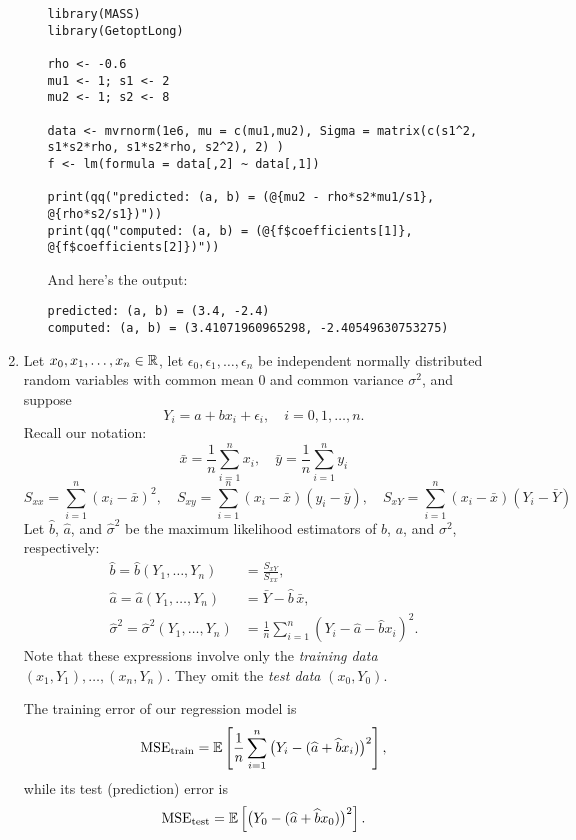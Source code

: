 \documentclass[12pt]{amsart}
\begin{document}
\begin{enumerate}
\begin{enumerate}
        \bigskip
        \begin{verbatim}
library(MASS)
library(GetoptLong)

rho <- -0.6
mu1 <- 1; s1 <- 2
mu2 <- 1; s2 <- 8

data <- mvrnorm(1e6, mu = c(mu1,mu2), Sigma = matrix(c(s1^2, s1*s2*rho, s1*s2*rho, s2^2), 2) )
f <- lm(formula = data[,2] ~ data[,1])

print(qq("predicted: (a, b) = (@{mu2 - rho*s2*mu1/s1}, @{rho*s2/s1})"))
print(qq("computed: (a, b) = (@{f$coefficients[1]}, @{f$coefficients[2]})"))
        \end{verbatim}

        And here's the output:

        \bigskip
        \begin{verbatim}
predicted: (a, b) = (3.4, -2.4)
computed: (a, b) = (3.41071960965298, -2.40549630753275)
        \end{verbatim}


    \end{enumerate}

    \item Let $x_0,x_1,\ldots,x_n\in\mathbb{R}$, let $\epsilon_0,\epsilon_1,\ldots,\epsilon_n$ be independent 
    normally distributed random variables with common mean $0$ and common variance $\sigma^2$,
    and suppose
    \[
        Y_i = a + bx_i + \epsilon_i,\quad i=0,1,\ldots,n.
    \]
    Recall our notation:
    \[
        \bar x = \frac1n\sum_{i=1}^n x_i,\quad \bar y = \frac1n\sum_{i=1}^n y_i
    \]
    \[
        S_{xx} = \sum_{i=1}^n (x_i - \bar x)^2,\quad
        S_{xy} = \sum_{i=1}^n(x_i-\bar x)(y_i - \bar y),\quad
        S_{xY} = \sum_{i=1}^n(x_i-\bar x)(Y_i - \bar Y)
    \]
    Let $\hat b$, $\hat a$, and $\hat \sigma^2$ be the maximum likelihood estimators of
    $b$, $a$, and $\sigma^2$, respectively:
    \begin{align*}
        \hat{b}=\hat{b}(Y_1,\ldots,Y_n) &= \frac{S_{xY}}{S_{xx}},\\
        \hat{a}=\hat{a}(Y_1,\ldots,Y_n) &=   \bar Y - \hat b\, \bar x,\\
        \hat{\sigma}^2=\hat{\sigma}^2(Y_1,\ldots,Y_n)
        &= \frac 1 n\sum_{i=1}^n (Y_i - \hat a - \hat b x_i)^2.
    \end{align*}
    Note that these expressions involve only the \emph{training data} $(x_1,Y_1),\ldots,(x_n,Y_n)$.
    They omit the \emph{test data} $(x_0, Y_0)$.
    
    The training error of our regression model is
    \[
        \operatorname{MSE}_\text{train} = \operatorname{\mathbb{E}}\left[\frac1n\sum_{i=1}^n \big(Y_i -(\widehat a + \widehat b x_i)\big)^2\right],
    \]
    while its test (prediction) error is
    \[
        \operatorname{MSE}_{\text{test}} = \operatorname{\mathbb{E}}\left[\big(Y_0 - (\widehat a + \widehat b x_0)\big)^2\right].
    \]
    

\end{enumerate}
\end{document}
